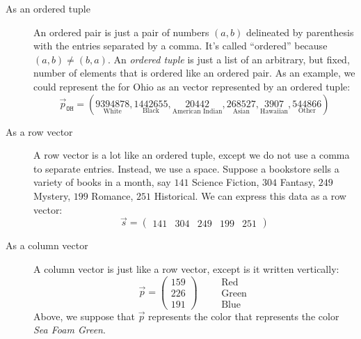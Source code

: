 \documentclass{ximera}
\begin{document}
\begin{concept}
\begin{description}
\item[As an ordered tuple] An ordered pair is just a pair of numbers
  $(a,b)$ delineated by parenthesis with the entries separated by a
  comma. It's called ``ordered'' because $(a,b) \ne (b,a)$. An \textit{ordered
  tuple} is just a list of an arbitrary, but fixed, number of elements
  that is ordered like an ordered pair. As an example, we could
  represent the  for Ohio as an vector
  represented by an ordered tuple:
  \[
  \vec{p}_{\texttt{OH}} = (\underset{\text{White}}{9394878},\underset{\text{Black}}{1442655},\underset{\text{American Indian}}{20442},\underset{\text{Asian}}{268527},\underset{\text{Hawaiian}}{3907},\underset{\text{Other}}{544866})
  \]
\item[As a row vector] A row vector is a lot like an ordered tuple,
  except we do not use a comma to separate entries. Instead, we use a
  space.  Suppose a bookstore sells a variety of books in a month, say
  $141$ Science Fiction,
  $304$ Fantasy,
  $249$ Mystery,
  $199$ Romance,
  $251$ Historical.
  We can express this data as a row vector:
  \[
  \vec{s} = \begin{pmatrix}141 & 304 & 249 & 199 & 251 \end{pmatrix}
  \]
  \item[As a column vector] A column vector is just like a row vector,
  except is it written vertically:
  \[
  \vec{p} = \begin{pmatrix}
    159\\  226 \\ 191\end{pmatrix}
    \qquad
    \begin{array}{l}
    \text{Red}\\
    \text{Green}\\
    \text{Blue}
    \end{array}
  \]
  Above, we suppose that $\vec{p}$ represents the color that
  represents the color \textit{Sea Foam Green}.

\end{description}
\end{concept}
\end{document}

